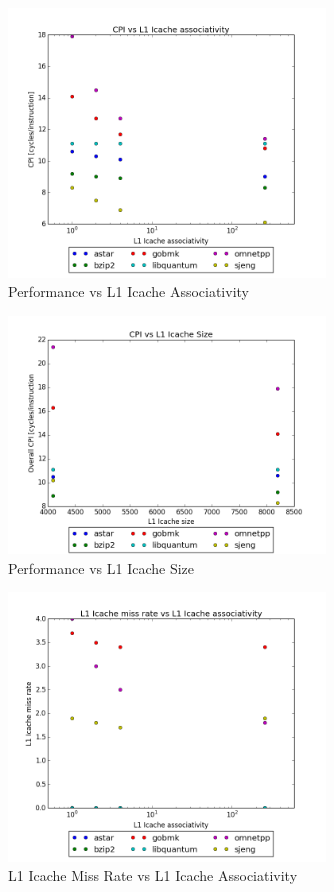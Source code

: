 \documentclass{article}
\begin{document}
\begin{figure}[ht]
    \centering
    \includegraphics[width=0.75\textwidth]{plots/CPI_vs_L1icache_assoc.png}
    \caption{Performance vs L1 Icache Associativity}
    \label{fig:cpivsl1iassoc}
\end{figure}

\begin{figure}[ht]
    \centering
    \includegraphics[width=0.75\textwidth]{plots/CPI_vs_L1icache_size.png}
    \caption{Performance vs L1 Icache Size}
    \label{fig:cpivsl1isize}
\end{figure}

\begin{figure}[ht]
    \centering
    \includegraphics[width=0.75\textwidth]{plots/L1icache_miss_vs_L1icache_Assoc.png}
    \caption{L1 Icache Miss Rate vs L1 Icache Associativity}
    \label{fig:L1imissvsl1iassoc}
\end{figure}
\end{document}

